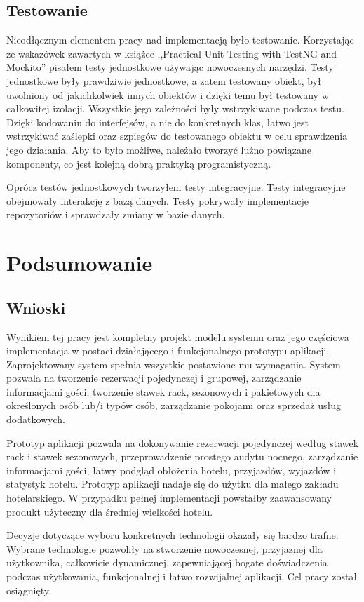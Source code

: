 \documentclass[a4paper,onecolumn,oneside,11pt,wide,floatssmall]{mwrep}
\theoremstyle{definition}
\theoremstyle{plain}%
\theoremstyle{remark}
\begin{document}
\section{Testowanie}
Nieodłącznym elementem pracy nad implementacją było testowanie. Korzystając ze wskazówek zawartych w książce ,,Practical Unit Testing with TestNG and Mockito'' \cite{kaczanowski2012practical} pisałem testy jednostkowe używając nowoczesnych narzędzi. Testy jednostkowe były prawdziwie jednostkowe, a zatem testowany obiekt, był uwolniony od jakichkolwiek innych obiektów i dzięki temu był testowany w całkowitej izolacji. Wszystkie jego zależności były wstrzykiwane podczas testu. Dzięki kodowaniu do interfejsów, a nie do konkretnych klas, łatwo jest wstrzykiwać zaślepki oraz szpiegów do testowanego obiektu w celu sprawdzenia jego działania. Aby to było możliwe, należało tworzyć luźno powiązane komponenty, co jest kolejną dobrą praktyką programistyczną.

Oprócz testów jednostkowych tworzyłem testy integracyjne. Testy integracyjne obejmowały interakcję z bazą danych. Testy pokrywały implementacje repozytoriów i sprawdzały zmiany w bazie danych. 

\chapter{Podsumowanie}

\section{Wnioski}
Wynikiem tej pracy jest kompletny projekt modelu systemu oraz jego częściowa implementacja w postaci działającego i funkcjonalnego prototypu aplikacji. Zaprojektowany system spełnia wszystkie postawione mu wymagania. System pozwala na tworzenie rezerwacji pojedynczej i grupowej, zarządzanie informacjami gości, tworzenie stawek rack, sezonowych i pakietowych dla określonych osób lub/i typów osób, zarządzanie pokojami oraz sprzedaż usług dodatkowych.

Prototyp aplikacji pozwala na dokonywanie rezerwacji pojedynczej według stawek rack i stawek sezonowych, przeprowadzenie prostego audytu nocnego, zarządzanie informacjami gości, łatwy podgląd obłożenia hotelu, przyjazdów, wyjazdów i statystyk hotelu. Prototyp aplikacji nadaje się do użytku dla małego zakładu hotelarskiego. W przypadku pełnej implementacji powstałby zaawansowany produkt użyteczny dla średniej wielkości hotelu.

Decyzje dotyczące wyboru konkretnych technologii okazały się bardzo trafne. Wybrane technologie pozwoliły na stworzenie nowoczesnej, przyjaznej dla użytkownika, całkowicie dynamicznej, zapewniającej bogate doświadczenia podczas użytkowania, funkcjonalnej i łatwo rozwijalnej aplikacji. Cel pracy został osiągnięty.
\end{document}
